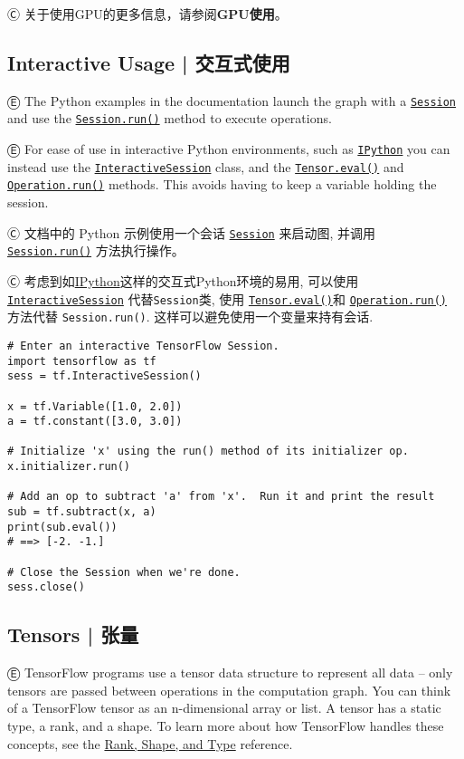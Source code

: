 Ⓒ 关于使用GPU的更多信息，请参阅\textbf{GPU使用}。

%
\subsection{Interactive Usage  |  交互式使用}

Ⓔ \textcolor{etc}{The Python examples in the documentation launch the graph with a \hyperref[class-tf.session]{\lstinline{Session}} and use the \hyperref[tf.session.run]{\lstinline{Session.run()}} method to execute operations.}

Ⓔ \textcolor{etc}{For ease of use in interactive Python environments, such as \href{http://ipython.org/}{\lstinline{IPython}} you can instead use the \hyperref[class-tf.interactivesession]{\lstinline{InteractiveSession}} class, and the \hyperref[tf.tensor.eval]{\lstinline{Tensor.eval()}} and \hyperref[tf.operation.run]{\lstinline{Operation.run()}} methods. This avoids having to keep a variable holding the session.}

Ⓒ 文档中的 Python 示例使用一个会话 \hyperref[class-tf.session]{\lstinline{Session}} 来启动图, 并调用 \hyperref[tf.session.run]{\lstinline{Session.run()}} 方法执行操作。

Ⓒ 考虑到如\href{http://ipython.org}{IPython}这样的交互式Python环境的易用, 可以使用\hyperref[class-tf.interactivesession]{\lstinline{InteractiveSession}} 代替\lstinline{Session}类, 使用 \hyperref[tf.tensor.eval]{\lstinline{Tensor.eval()}}和 \hyperref[tf.operation.run]{\lstinline{Operation.run()}} 方法代替 \lstinline{Session.run()}. 这样可以避免使用一个变量来持有会话.

\begin{lstlisting}
# Enter an interactive TensorFlow Session.
import tensorflow as tf
sess = tf.InteractiveSession()

x = tf.Variable([1.0, 2.0])
a = tf.constant([3.0, 3.0])

# Initialize 'x' using the run() method of its initializer op.
x.initializer.run()

# Add an op to subtract 'a' from 'x'.  Run it and print the result
sub = tf.subtract(x, a)
print(sub.eval())
# ==> [-2. -1.]

# Close the Session when we're done.
sess.close()
\end{lstlisting}

%

\subsection{Tensors  |  张量}
Ⓔ \textcolor{etc}{TensorFlow programs use a tensor data structure to represent all data -- only tensors are passed between operations in the computation graph. You can think of a TensorFlow tensor as an n-dimensional array or list. A tensor has a static type, a rank, and a shape. To learn more about how TensorFlow handles these concepts, see the \href{https://www.tensorflow.org/versions/master/resources/dims_types.html#tensor-ranks-shapes-and-types}{Rank, Shape, and Type} reference.}

